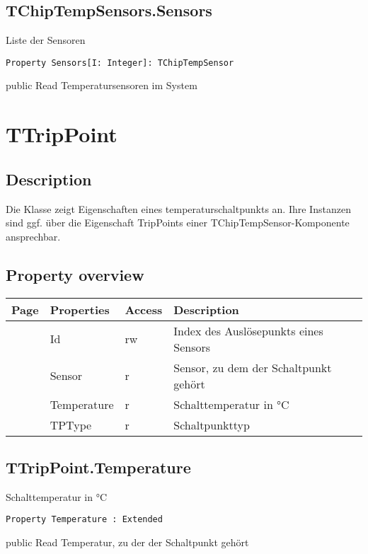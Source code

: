 \subsection{TChipTempSensors.Sensors}
\label{computer:chiptemp:tchiptempsensors:sensors}
\begin{FPCList}
\Synopsis
Liste der Sensoren\Declaration 

\begin{verbatim}
Property Sensors[I: Integer]: TChipTempSensor
\end{verbatim}
\Visibility
public
\Access
Read
\Description
Temperatursensoren im System\end{FPCList}
\section{TTripPoint}
\label{computer:chiptemp:ttrippoint}
\subsection{Description}
Die Klasse zeigt Eigenschaften eines temperaturschaltpunkts an. Ihre Instanzen sind ggf. über die Eigenschaft TripPoints einer TChipTempSensor-Komponente ansprechbar.%
\subsection{Property overview}
\label{computer:chiptemp:ttrippoint:properties}
\begin{tabularx}{\textwidth}{lllX}
Page & Properties & Access & Description \\ \hline
\pageref{computer:chiptemp:ttrippoint:id} & Id & rw & Index des Auslösepunkts eines Sensors \\
\pageref{computer:chiptemp:ttrippoint:sensor} & Sensor & r & Sensor, zu dem der Schaltpunkt gehört \\
\pageref{computer:chiptemp:ttrippoint:temperature} & Temperature & r & Schalttemperatur in °C \\
\pageref{computer:chiptemp:ttrippoint:tptype} & TPType & r & Schaltpunkttyp \\
\hline
\end{tabularx}
\subsection{TTripPoint.Temperature}
\label{computer:chiptemp:ttrippoint:temperature}
\begin{FPCList}
\Synopsis
Schalttemperatur in °C\Declaration 

\begin{verbatim}
Property Temperature : Extended
\end{verbatim}
\Visibility
public
\Access
Read
\Description
Temperatur, zu der der Schaltpunkt gehört\end{FPCList}
